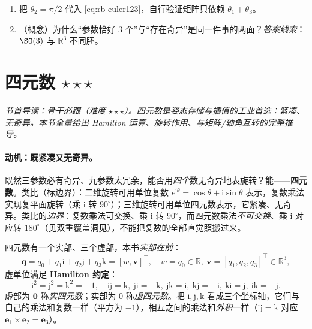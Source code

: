 \begin{practice}
\begin{enumerate}
  \item 把 $\theta_2=\pi/2$ 代入 \cref{eq:rb-euler123}，自行验证矩阵只依赖 $\theta_1+\theta_3$。
  \item （概念）为什么“参数恰好 $3$ 个”与“存在奇异”是同一件事的两面？\emph{答案线索}：$\SO(3)$ 与 $\mathbb{R}^3$ 不同胚。
\end{enumerate}
\end{practice}

\section{四元数 \texorpdfstring{$\star\star\star$}{***}}
\label{sec:rb-quat}
\noindent\emph{节首导读：骨干必跟（难度 $\star\star\star$）。四元数是姿态\emph{存储与插值}的工业首选：紧凑、无奇异。本节全量给出 Hamilton 运算、旋转作用、与矩阵/轴角互转的完整推导。}

\paragraph{动机：既紧凑又无奇异。}既然三参数必有奇异、九参数太冗余，能否用\emph{四个}数无奇异地表旋转？能——\textbf{四元数}\cite{gaoxiang2019slam14}。类比（标边界）：二维旋转可用单位复数 $e^{\mathrm{i}\theta}=\cos\theta+\mathrm{i}\sin\theta$ 表示，复数乘法实现复平面旋转（乘 $\mathrm{i}$ 转 $90^\circ$）；三维旋转可用单位四元数表示，它紧凑、无奇异。类比的\emph{边界}：复数乘法可交换、乘 $\mathrm{i}$ 转 $90^\circ$，而四元数乘法\emph{不可交换}、乘 $\mathrm{i}$ 对应转 $180^\circ$（见双重覆盖洞见），不能把复数的全部直觉照搬过来。

\begin{definition}\label{def:quat}
四元数有一个实部、三个虚部，本书\emph{实部在前}：
\begin{equation}
  \mathbf{q}=q_0+q_1\mathrm{i}+q_2\mathrm{j}+q_3\mathrm{k}=[w,\mathbf{v}]^\top,\quad w=q_0\in\mathbb{R},\ \mathbf{v}=[q_1,q_2,q_3]^\top\in\mathbb{R}^3,
\end{equation}
虚单位满足 \textbf{Hamilton 约定}：
\begin{equation}
  \mathrm{i}^2=\mathrm{j}^2=\mathrm{k}^2=-1,\quad \mathrm{ij}=\mathrm{k},\ \mathrm{ji}=-\mathrm{k},\ \mathrm{jk}=\mathrm{i},\ \mathrm{kj}=-\mathrm{i},\ \mathrm{ki}=\mathrm{j},\ \mathrm{ik}=-\mathrm{j}.
  \label{eq:rb-quat-rules}
\end{equation}
虚部为 $\mathbf{0}$ 称\emph{实四元数}；实部为 $0$ 称\emph{虚四元数}。把 $\mathrm{i,j,k}$ 看成三个坐标轴，它们与自己的乘法和复数一样（平方为 $-1$），相互之间的乘法和\emph{外积}一样（$\mathrm{ij}=\mathrm{k}$ 对应 $\mathbf{e}_1\times\mathbf{e}_2=\mathbf{e}_3$）。
\end{definition}

